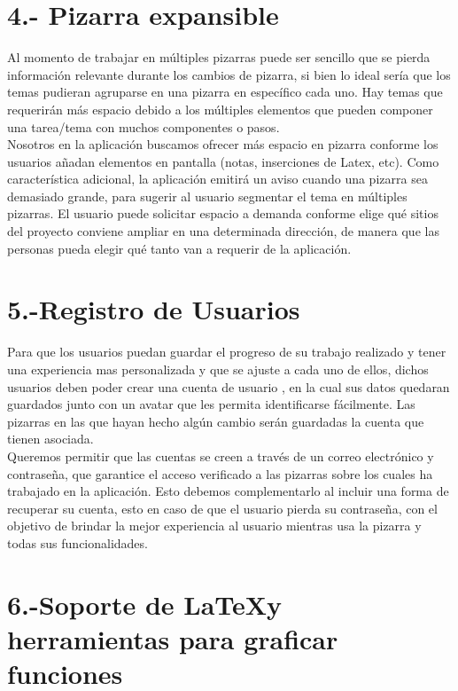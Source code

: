 \documentclass[a4paper, oneside, final]{scrartcl}
\begin{document}
\section{4.- Pizarra expansible} %

 Al momento de trabajar en múltiples pizarras puede ser sencillo que se pierda información relevante durante los cambios de pizarra, si bien lo ideal sería que los temas pudieran agruparse en una pizarra en específico cada uno. Hay temas que requerirán más espacio debido a los múltiples elementos que pueden componer una tarea/tema con muchos componentes o pasos.\\

  Nosotros en la aplicación buscamos ofrecer más espacio en pizarra conforme los usuarios añadan elementos en pantalla (notas, inserciones de Latex, etc). Como característica adicional, la aplicación emitirá un aviso cuando una pizarra sea demasiado grande, para sugerir al usuario segmentar el tema en múltiples pizarras. El usuario puede solicitar espacio a demanda conforme elige qué sitios del proyecto conviene ampliar en una determinada dirección, de manera que las personas pueda elegir qué tanto van a requerir de la aplicación.


\noindent
\section{5.-Registro de Usuarios} %

    Para que los usuarios puedan guardar el progreso de su trabajo realizado y tener una experiencia mas personalizada y que se ajuste a cada uno de ellos, dichos usuarios deben poder crear una cuenta de usuario , en la cual sus datos quedaran guardados junto con un avatar que les permita identificarse fácilmente. Las pizarras en las que hayan hecho algún cambio serán guardadas la cuenta que tienen asociada.\\
    
    Queremos permitir que las cuentas se creen a través de un correo electrónico y contraseña, que garantice el acceso verificado a las pizarras sobre los cuales ha trabajado en la aplicación. Esto debemos complementarlo al incluir una forma de recuperar su cuenta, esto en caso de que el usuario pierda su contraseña, con el objetivo de brindar la mejor experiencia al usuario mientras usa la pizarra y todas sus funcionalidades.


\noindent
\section{6.-Soporte de \LaTeX y herramientas para graficar funciones}
    
\end{document}
